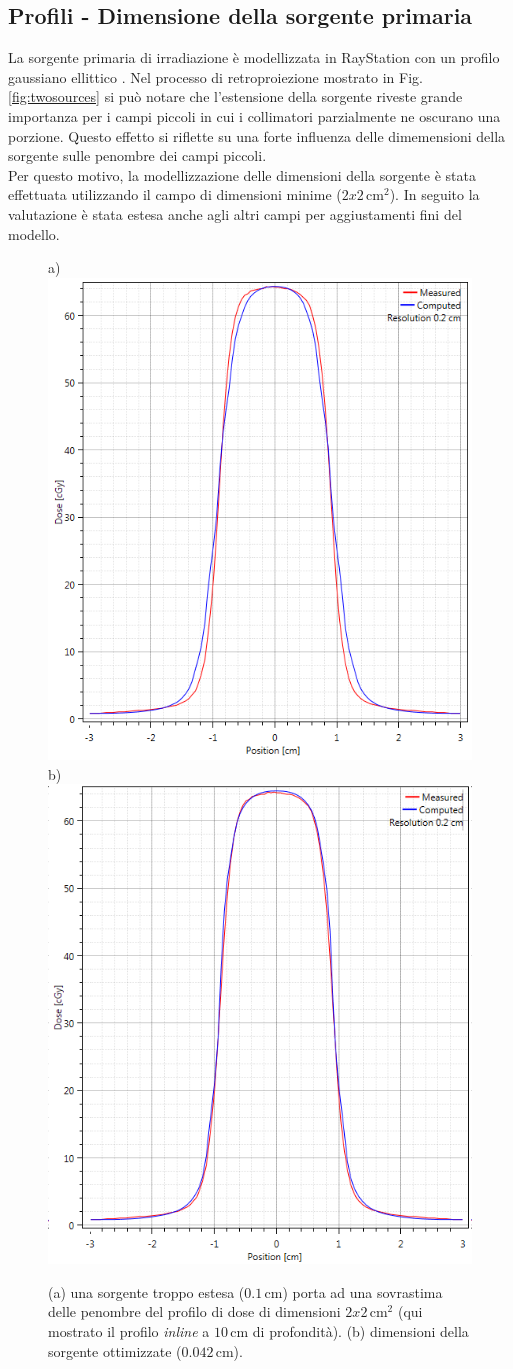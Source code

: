 \subsection{Profili - Dimensione della sorgente primaria}
La sorgente primaria di irradiazione è modellizzata in RayStation con un profilo gaussiano ellittico \cite{Chaney1994}. Nel processo di retroproiezione mostrato in Fig.\ref{fig:twosources} si può notare che l'estensione della sorgente riveste grande importanza per i campi piccoli in cui i collimatori parzialmente ne oscurano una porzione. Questo effetto si riflette su una forte influenza delle dimemensioni della sorgente sulle penombre dei campi piccoli.\\
Per questo motivo, la modellizzazione delle dimensioni della sorgente è stata effettuata utilizzando il campo di dimensioni minime ($2x2\,$cm$^2$). In seguito la valutazione è stata estesa anche agli altri campi per aggiustamenti fini del modello.
\begin{figure}
\centering
a)\includegraphics[width=.43\textwidth]{./cap2/Ray_penumbra_wrong.PNG}
b)\includegraphics[width=.43\textwidth]{./cap2/Ray_penumbra_right.PNG}
\caption{(a) una sorgente troppo estesa ($0.1\,$cm) porta ad una sovrastima delle penombre del profilo di dose di dimensioni $2x2\,$cm$^2$ (qui mostrato il profilo \textit{inline} a $10\,$cm di profondità). (b) dimensioni della sorgente ottimizzate ($0.042\,$cm).}
\label{fig:source_2x2}
\end{figure}


